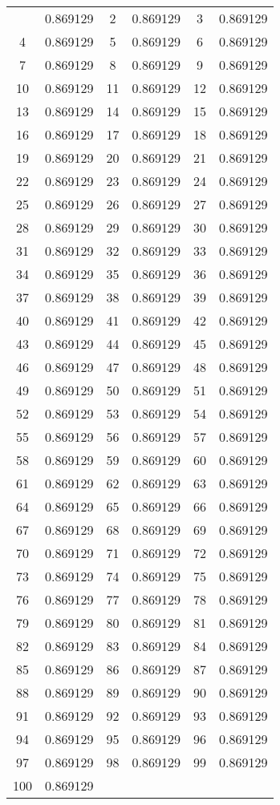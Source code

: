\documentclass[12pt]{article}
\begin{document}
\begin{longtable}{@{}cc|cc|cc@{}}
\bottomrule
\endlastfoot
1 & 0.869129 & 2 & 0.869129 & 3 & 0.869129 \\
4 & 0.869129 & 5 & 0.869129 & 6 & 0.869129 \\
7 & 0.869129 & 8 & 0.869129 & 9 & 0.869129 \\
10 & 0.869129 & 11 & 0.869129 & 12 & 0.869129 \\
13 & 0.869129 & 14 & 0.869129 & 15 & 0.869129 \\
16 & 0.869129 & 17 & 0.869129 & 18 & 0.869129 \\
19 & 0.869129 & 20 & 0.869129 & 21 & 0.869129 \\
22 & 0.869129 & 23 & 0.869129 & 24 & 0.869129 \\
25 & 0.869129 & 26 & 0.869129 & 27 & 0.869129 \\
28 & 0.869129 & 29 & 0.869129 & 30 & 0.869129 \\
31 & 0.869129 & 32 & 0.869129 & 33 & 0.869129 \\
34 & 0.869129 & 35 & 0.869129 & 36 & 0.869129 \\
37 & 0.869129 & 38 & 0.869129 & 39 & 0.869129 \\
40 & 0.869129 & 41 & 0.869129 & 42 & 0.869129 \\
43 & 0.869129 & 44 & 0.869129 & 45 & 0.869129 \\
46 & 0.869129 & 47 & 0.869129 & 48 & 0.869129 \\
49 & 0.869129 & 50 & 0.869129 & 51 & 0.869129 \\
52 & 0.869129 & 53 & 0.869129 & 54 & 0.869129 \\
55 & 0.869129 & 56 & 0.869129 & 57 & 0.869129 \\
58 & 0.869129 & 59 & 0.869129 & 60 & 0.869129 \\
61 & 0.869129 & 62 & 0.869129 & 63 & 0.869129 \\
64 & 0.869129 & 65 & 0.869129 & 66 & 0.869129 \\
67 & 0.869129 & 68 & 0.869129 & 69 & 0.869129 \\
70 & 0.869129 & 71 & 0.869129 & 72 & 0.869129 \\
73 & 0.869129 & 74 & 0.869129 & 75 & 0.869129 \\
76 & 0.869129 & 77 & 0.869129 & 78 & 0.869129 \\
79 & 0.869129 & 80 & 0.869129 & 81 & 0.869129 \\
82 & 0.869129 & 83 & 0.869129 & 84 & 0.869129 \\
85 & 0.869129 & 86 & 0.869129 & 87 & 0.869129 \\
88 & 0.869129 & 89 & 0.869129 & 90 & 0.869129 \\
91 & 0.869129 & 92 & 0.869129 & 93 & 0.869129 \\
94 & 0.869129 & 95 & 0.869129 & 96 & 0.869129 \\
97 & 0.869129 & 98 & 0.869129 & 99 & 0.869129 \\
100 & 0.869129 &  &  &  &  \\

\end{longtable}
\end{document}
